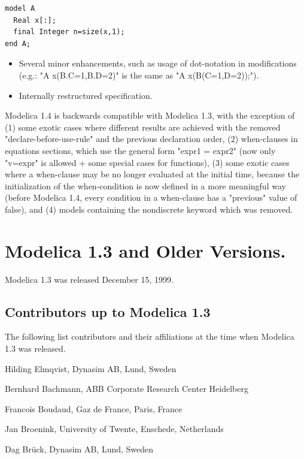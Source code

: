 \documentclass[10pt,a4paper]{report}
\def\doublelabel#1{\label{#1}}
\begin{document}
\begin{lstlisting}[language=modelica]
model A
  Real x[:];
  final Integer n=size(x,1);
end A;
\end{lstlisting}

\begin{itemize}
\item
  Several minor enhancements, such as usage of dot-notation in
  modifications\\
  (e.g.: "A x(B.C=1,B.D=2)" is the same as "A x(B(C=1,D=2));").
\item
  Internally restructured specification.
\end{itemize}

Modelica 1.4 is backwards compatible with Modelica 1.3, with the
exception of (1) some exotic cases where different results are achieved
with the removed "declare-before-use-rule" and the previous declaration
order, (2) when-clauses in equations sections, which use the general
form "expr1 = expr2" (now only "v=expr" is allowed + some special cases
for functions), (3) some exotic cases where a when-clause may be no
longer evaluated at the initial time, because the initialization of the
when-condition is now defined in a more meaningful way (before Modelica
1.4, every condition in a when-clause has a "previous" value of false),
and (4) models containing the nondiscrete keyword which was removed.

\section{Modelica 1.3 and Older Versions.}\doublelabel{modelica-1-3-and-older-versions}

Modelica 1.3 was released December 15, 1999.

\subsection{Contributors up to Modelica 1.3}\doublelabel{contributors-up-to-modelica-1-3}
The following list contributors and their affiliations at the time when
Modelica 1.3 was released.

Hilding Elmqvist, Dynasim AB, Lund, Sweden

Bernhard Bachmann, ABB Corporate Research Center Heidelberg

Francois Boudaud, Gaz de France, Paris, France

Jan Broenink, University of Twente, Enschede, Netherlands

Dag Brück, Dynasim AB, Lund, Sweden
\end{document}

